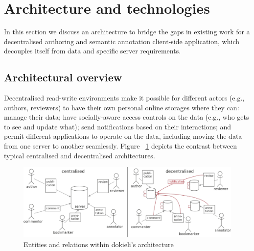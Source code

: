 \documentclass[a4paper]{llncs}
\begin{document}
                    

                    
                        \section{Architecture and technologies}
  \label{architecture-and-technologies}

                        
                            
\par In this section we discuss an architecture to bridge the gaps in existing work for a decentralised authoring and semantic annotation client-side application, which decouples itself from data and specific server requirements.

                            
                                \subsection{Architectural overview}
  \label{architectural-overview}

                                
                                    
\par Decentralised read-write environments make it possible for different actors (e.g., authors, reviewers) to have their own personal online storages where they can: manage their data; have socially-aware access controls on the data (e.g., who gets to see and update what); send notifications based on their interactions; and permit different applications to operate on the data, including moving the data from one server to another seamlessly. Figure ~\ref{fig:centralised-decentralised-architectures} depicts the contrast between typical centralised and decentralised architectures.

\begin{figure}
  \centering
  \includegraphics[width=\textwidth]{media/images/centralised-decentralised-architectures}
  \caption{Entities and relations within dokieli’s architecture}
  \label{fig:centralised-decentralised-architectures}
\end{figure}
\end{document}
